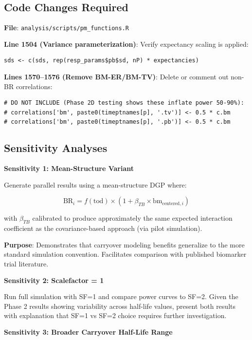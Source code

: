 \documentclass[12pt,a4paper]{article}
\begin{document}
\subsection{Code Changes Required}

\textbf{File}: \texttt{analysis/scripts/pm\_functions.R}

\textbf{Line 1504 (Variance parameterization)}: Verify expectancy scaling is applied:
\begin{verbatim}
sds <- c(sds, rep(resp_params$pb$sd, nP) * expectancies)
\end{verbatim}

\textbf{Lines 1570--1576 (Remove BM-ER/BM-TV)}: Delete or comment out non-BR correlations:
\begin{verbatim}
# DO NOT INCLUDE (Phase 2D testing shows these inflate power 50-90%):
# correlations['bm', paste0(timeptnames[p], '.tv')] <- 0.5 * c.bm
# correlations['bm', paste0(timeptnames[p], '.pb')] <- 0.5 * c.bm
\end{verbatim}

\subsection{Sensitivity Analyses}

\textbf{Sensitivity 1: Mean-Structure Variant}

Generate parallel results using a mean-structure DGP where:

\begin{equation}
\text{BR}_i = f(\text{tod}) \times (1 + \beta_{TB} \times \text{bm}_{\text{centered}, i})
\end{equation}

with $\beta_{TB}$ calibrated to produce approximately the same expected interaction coefficient as the covariance-based approach (via pilot simulation).

\textbf{Purpose}: Demonstrates that carryover modeling benefits generalize to the more standard simulation convention. Facilitates comparison with published biomarker trial literature.

\textbf{Sensitivity 2: Scalefactor = 1}

Run full simulation with SF=1 and compare power curves to SF=2. Given the Phase 2 results showing variability across half-life values, present both results with explanation that SF=1 vs SF=2 choice requires further investigation.

\textbf{Sensitivity 3: Broader Carryover Half-Life Range}
\end{document}
